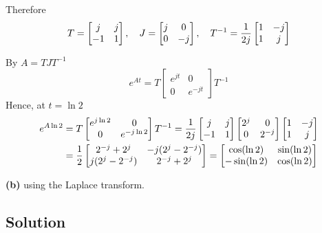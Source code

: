 \documentclass[12pt,a4paper]{article}
\begin{document}
Therefore 
\[
T = \begin{bmatrix}
	j & j \\ -1 & 1
\end{bmatrix}, \quad J = \begin{bmatrix}
j & 0 \\ 0 & -j
\end{bmatrix}, \quad T^{-1} = {1\over 2j} \begin{bmatrix}
1 & -j \\ 1 & j
\end{bmatrix}
\]

By $A = TJT^{-1}$
\[
e^{At} = T \begin{bmatrix}
	e^{jt} & 0 \\ 0 & e^{-jt} 
\end{bmatrix} T^{-1}
\]
Hence, at $ t = \ln 2$ 
\begin{align*}
e^{A\ln2} &= T\begin{bmatrix}
	e^{j\ln2} & 0 \\ 0 & e^{-j\ln2}
\end{bmatrix}T^{-1} = {1\over 2j}\begin{bmatrix}
		j & j \\ -1 & 1
\end{bmatrix}\begin{bmatrix}
2^j & 0 \\ 0 & 2^{-j}
\end{bmatrix} \begin{bmatrix}
1 & -j \\ 1 & j
\end{bmatrix} \\&= {1\over2}\begin{bmatrix}
2^{-j} + 2^j & -j(2^j - 2^{-j}) \\
j(2^j - 2^{-j}) &2^{-j} + 2^j
\end{bmatrix} = \begin{bmatrix}
\cos(\ln2) & \sin(\ln2) \\ -\sin(\ln2) & \cos(\ln2)
\end{bmatrix}
\end{align*}

\vspace{3cm}

\needspace{6cm}
\textbf{(b)} using the Laplace transform.
\subsection*{Solution}
\end{document}
